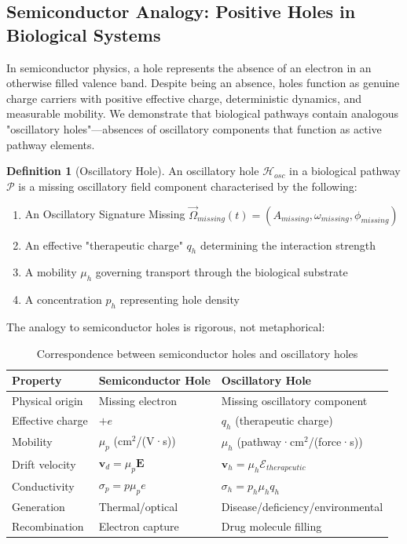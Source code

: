 \documentclass{article}
\theoremstyle{definition}
\newtheorem{definition}[theorem]{Definition}
\theoremstyle{remark}
\begin{document}
\subsection{Semiconductor Analogy: Positive Holes in Biological Systems}

In semiconductor physics, a hole represents the absence of an electron in an otherwise filled valence band. Despite being an absence, holes function as genuine charge carriers with positive effective charge, deterministic dynamics, and measurable mobility\cite{Ashcroft1976,Kittel2005}. We demonstrate that biological pathways contain analogous "oscillatory holes"—absences of oscillatory components that function as active pathway elements.

\begin{definition}[Oscillatory Hole]
An oscillatory hole $\mathcal{H}_{osc}$ in a biological pathway $\mathcal{P}$ is a missing oscillatory field component characterised by the following:
\begin{enumerate}
\item An Oscillatory Signature Missing $\vec{\Omega}_{missing}(t) = (A_{missing}, \omega_{missing}, \phi_{missing})$
\item An effective "therapeutic charge" $q_h$ determining the interaction strength
\item A mobility $\mu_h$ governing transport through the biological substrate
\item A concentration $p_h$ representing hole density
\end{enumerate}
\end{definition}

The analogy to semiconductor holes is rigorous, not metaphorical:

\begin{table}[h]
\centering
\caption{Correspondence between semiconductor holes and oscillatory holes}
\label{tab:hole_correspondence}
\begin{tabular}{lll}
\toprule
\textbf{Property} & \textbf{Semiconductor Hole} & \textbf{Oscillatory Hole} \\
\midrule
Physical origin & Missing electron & Missing oscillatory component \\
Effective charge & $+e$ & $q_h$ (therapeutic charge) \\
Mobility & $\mu_p$ (cm$^2$/(V·s)) & $\mu_h$ (pathway·cm$^2$/(force·s)) \\
Drift velocity & $\mathbf{v}_d = \mu_p \mathbf{E}$ & $\mathbf{v}_h = \mu_h \mathcal{E}_{therapeutic}$ \\
Conductivity & $\sigma_p = p \mu_p e$ & $\sigma_h = p_h \mu_h q_h$ \\
Generation & Thermal/optical & Disease/deficiency/environmental \\
Recombination & Electron capture & Drug molecule filling \\
\bottomrule
\end{tabular}
\end{table}
\end{document}
